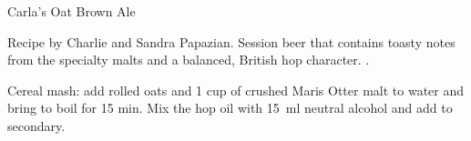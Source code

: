 \begin{recipe}{Carla's Oat Brown Ale}

\begin{aboutblock}
Recipe by Charlie and Sandra Papazian. Session beer that contains toasty notes
from the specialty malts and a balanced, British hop character.
.
\end{aboutblock}


\begin{methodandtiming}

\begin{mashsteps}
\end{mashsteps}

\begin{fermentationsteps}
\end{fermentationsteps}

\begin{directions}
Cereal mash: add rolled oats and 1 cup of crushed Maris Otter malt to 
water and bring to boil for 15 min. Mix the hop oil with 15~ml neutral alcohol
and add to secondary.
\end{directions}

\end{methodandtiming}

\recipebreak

\begin{ingredientsblock}

\begin{malts}
\end{malts}

\begin{hops}
\end{hops}


\end{ingredientsblock}

\end{recipe}


